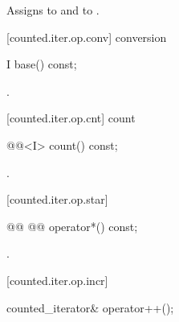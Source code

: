 \begin{addedblock}
\begin{itemdescr}
\pnum
\effects Assigns  to
 and  to .

\end{itemdescr}

[counted.iter.op.conv]{ conversion}

%
%
\begin{itemdecl}
I base() const;
\end{itemdecl}

\begin{itemdescr}
\pnum
\returns {}.
\end{itemdescr}

[counted.iter.op.cnt]{ count}

%
%
\begin{itemdecl}
@@<I> count() const;
\end{itemdecl}

\begin{itemdescr}
\pnum
\returns {}.
\end{itemdescr}

[counted.iter.op.star]{}

%
%
\begin{itemdecl}
@@
@@ operator*() const;
\end{itemdecl}

\begin{itemdescr}
\pnum
{}
.
\end{itemdescr}

[counted.iter.op.incr]{}

%
%
\begin{itemdecl}
counted_iterator& operator++();
\end{itemdecl}

\begin{itemdescr}
\pnum
\requires {}


\end{itemdescr}
\end{addedblock}

